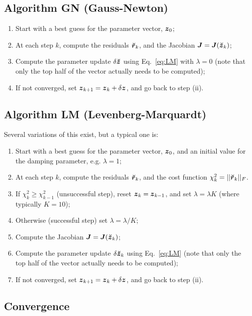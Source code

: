 \documentclass[useAMS,usenatbib]{mn2e}
\newcommand{\zz}{\bmath{z}}
\newcommand{\mat}[1]{{\bmath{#1}}}
\newcommand{\JJ}{\mat{J}} %
\newcommand{\AUG}[1]{\bmath{\breve{#1}}}
\newcommand{\Zz}{\AUG{z}}
\newcommand{\Rr}{\AUG{r}}
\numberwithin{equation}{section} %
\begin{document}
\subsection{Algorithm GN (Gauss-Newton)}

\begin{enumerate}
\item Start with a best guess for the parameter vector, $\bmath{z}_0$;
\item At each step $k$, compute the residuals $\Rr_k$, and the Jacobian
$\JJ=\JJ(\Zz_k)$;
\item Compute the parameter update $\delta\Zz$ using Eq.~\ref{eq:LM} with $\lambda=0$ (note that only the top half of the vector actually needs to be computed);
\item If not converged, set $\bmath{z}_{k+1}=\bmath{z}_k+\delta\zz$, and go back to step (ii).
\end{enumerate}

\subsection{Algorithm LM (Levenberg-Marquardt)}

Several variations of this exist, but a typical one is:

\begin{enumerate}
\item Start with a best guess for the parameter vector, $\bmath{z}_0$, and an initial value
for the damping parameter, e.g. $\lambda=1$;
\item At each step $k$, compute the residuals $\Rr_k$, and the cost function $\chi^2_k=||\Rr_k||_F$.
\item If $\chi^2_k\ge\chi^2_{k-1}$ (unsuccessful step), reset $\zz_k=\zz_{k-1}$, and set $\lambda=\lambda K$ (where typically $K=10$);
\item Otherwise (successful step) set $\lambda=\lambda/K$;
\item Compute the Jacobian $\JJ=\JJ(\Zz_k)$;
\item Compute the parameter update $\delta\Zz_k$ using Eq.~\ref{eq:LM} (note that only the top half of the vector actually needs to be computed);
\item If not converged, set $\bmath{z}_{k+1}=\bmath{z}_k+\delta\zz$, and go back to step (ii).
\end{enumerate}

\subsection{Convergence}
\end{document}

